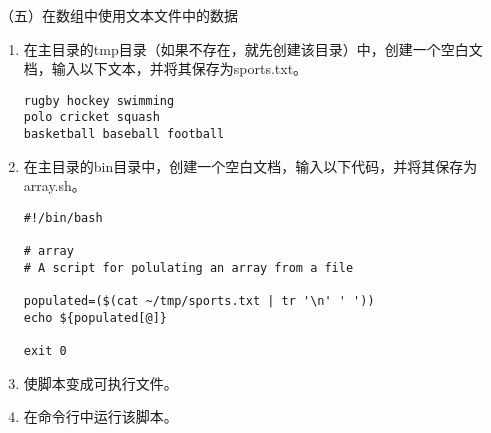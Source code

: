 \vspace{0.1in}
（五）在数组中使用文本文件中的数据
\begin{enumerate}
  \item 在主目录的tmp目录（如果不存在，就先创建该目录）中，创建一个空白文档，输入以下文本，并将其保存为sports.txt。
\begin{verbatim}
rugby hockey swimming
polo cricket squash
basketball baseball football
\end{verbatim}
  \item 在主目录的bin目录中，创建一个空白文档，输入以下代码，并将其保存为array.sh。
\begin{lstlisting}
#!/bin/bash

# array
# A script for polulating an array from a file

populated=($(cat ~/tmp/sports.txt | tr '\n' ' '))
echo ${populated[@]}

exit 0
\end{lstlisting}
  \item 使脚本变成可执行文件。
  \item 在命令行中运行该脚本。
\end{enumerate}

